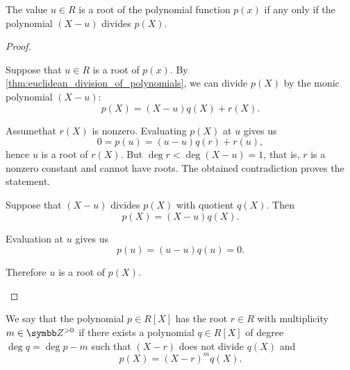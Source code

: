 \begin{proposition}\label{thm:polynomial_root_iff_divisible}
  The value \( u \in R \) is a root of the polynomial function \( p(x) \) if any only if the polynomial \( (X - u) \) divides \( p(X) \).
\end{proposition}
\begin{proof}
  \begin{description}
    \Implies Suppose that \( u \in R \) is a root of \( p(x) \). By \cref{thm:euclidean_division_of_polynomials}, we can divide \( p(X) \) by the monic polynomial \( (X - u) \):
    \begin{equation*}
      p(X) = (X - u) q(X) + r(X).
    \end{equation*}

    Assume\LEM that \( r(X) \) is nonzero. Evaluating \( p(X) \) at \( u \) gives us
    \begin{equation*}
      0 = p(u) = (u - u) q(r) + r(u),
    \end{equation*}
    hence \( u \) is a root of \( r(X) \). But \( \deg r < \deg (X - u) = 1 \), that is, \( r \) is a nonzero constant and cannot have roots. The obtained contradiction proves the statement.

    \ImpliedBy Suppose that \( (X - u) \) divides \( p(X) \) with quotient \( q(X) \). Then
    \begin{equation*}
      p(X) = (X - u) q(X).
    \end{equation*}

    Evaluation at \( u \) gives us
    \begin{equation*}
      p(u) = (u - u) q(u) = 0.
    \end{equation*}

    Therefore \( u \) is a root of \( p(X) \).
  \end{description}
\end{proof}

\begin{definition}\label{def:polynomial_root_multiplicity}
  We say that the polynomial \( p \in R[X] \) has the root \( r \in R \) with multiplicity \( m \in \Z^{>0} \) if there exists a polynomial \( q \in R[X] \) of degree \( \deg q = \deg p - m \) such that \( (X - r) \) does not divide \( q(X) \) and
  \begin{equation*}
    p(X) = (X - r)^m q(X).
  \end{equation*}
\end{definition}

